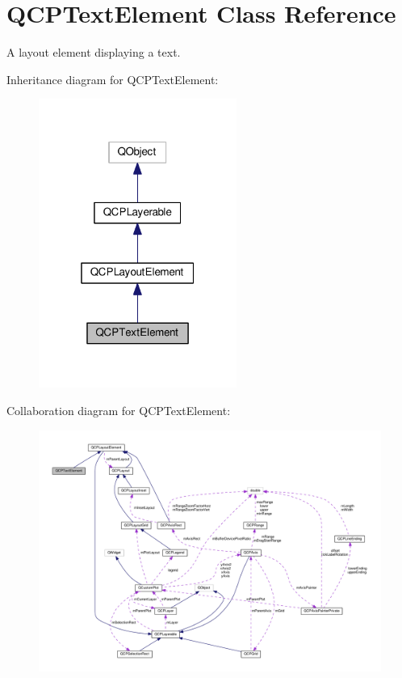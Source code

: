 \hypertarget{classQCPTextElement}{}\section{Q\+C\+P\+Text\+Element Class Reference}
\label{classQCPTextElement}


A layout element displaying a text.  




Inheritance diagram for Q\+C\+P\+Text\+Element\+:
\nopagebreak
\begin{figure}[H]
\begin{center}
\leavevmode
\includegraphics[width=184pt]{classQCPTextElement__inherit__graph}
\end{center}
\end{figure}


Collaboration diagram for Q\+C\+P\+Text\+Element\+:
\nopagebreak
\begin{figure}[H]
\begin{center}
\leavevmode
\includegraphics[width=350pt]{classQCPTextElement__coll__graph}
\end{center}
\end{figure}
